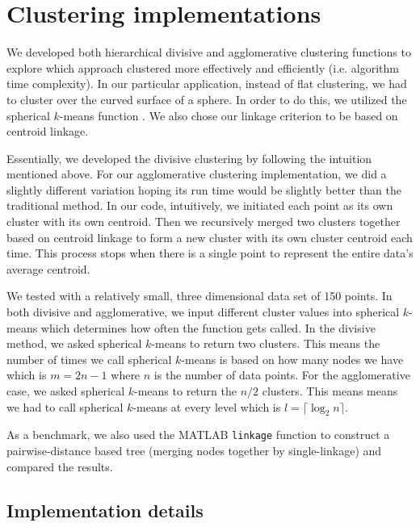 \documentclass[../tech_report_1.tex]{subfiles}
\begin{document}
\section{Clustering implementations}

We developed both hierarchical divisive and agglomerative clustering
functions to explore which approach clustered more effectively and efficiently (i.e. algorithm time complexity).
In our particular
application, instead of flat clustering, we had to cluster over the
curved surface of a sphere. In order to do this, we utilized the spherical $k$-means
function  \cite{nguyen_spherical_clustering}. We also chose our linkage criterion
to be based on centroid linkage.

Essentially, we developed the divisive clustering by following the
intuition mentioned above. For our agglomerative clustering implementation,
we did a slightly different variation hoping its run time would be
slightly better than the traditional method. In our code, intuitively,
we initiated each point as its own cluster with its own centroid.
Then we recursively merged two clusters together based on centroid
linkage to form a new cluster with its own cluster centroid each time.
This process stops when there is a single point to represent the entire
data's average centroid.

We tested with a relatively small,
three dimensional data set of 150 points. In both 
divisive and agglomerative, we input different cluster values into
spherical $k$-means which determines how often the function gets called. In the
divisive method, we asked spherical $k$-means to return two clusters.
This means the number of times we call spherical $k$-means
is based on how many nodes we have which is $m=2n-1$ where $n$ is
the number of data points. For the agglomerative case, we asked spherical $k$-means to
return the $n/2$ clusters. This means means we had to call spherical $k$-means
at every level which is $l=\lceil\log_{2}n\rceil$.


As a benchmark, we also used the MATLAB \texttt{linkage} function to construct a pairwise-distance based tree (merging nodes together by single-linkage) and compared the results.

\subsection{Implementation details}\label{hierarchical_clustering_implementation_details}
\end{document}
